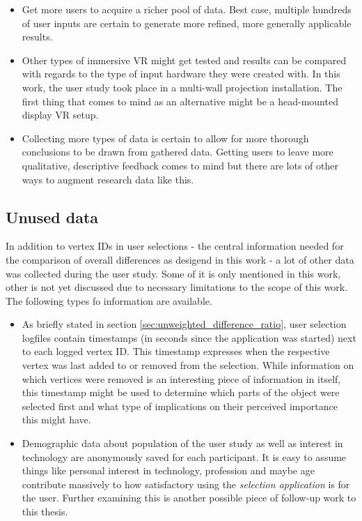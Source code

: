 \begin{itemize}
	\item Get more users to acquire a richer pool of data. Best case, multiple hundreds of user inputs are certain to generate more refined, more generally applicable results.
	\item Other types of immersive VR might get tested and results can be compared with regards to the type of input hardware they were created with. In this work, the user study took place in a multi-wall projection installation. The first thing that comes to mind as an alternative might be a head-mounted display VR setup.
	\item Collecting more types of data is certain to allow for more thorough conclusions to be drawn from gathered data. Getting users to leave more qualitative, descriptive feedback comes to mind but there are lots of other ways to augment research data like this.
\end{itemize}

	\subsection{Unused data}
	\label{sec:unused_data}
In addition to vertex IDs in user selections - the central information needed for the comparison of overall differences as desigend in this work - a lot of other data was collected during the user study. Some of it is only mentioned in this work, other is not yet discussed due to necessary limitations to the scope of this work. The following types fo information are available.

\begin{itemize}
	\item As briefly stated in section \ref{sec:unweighted_difference_ratio}, user selection logfiles contain timestamps (in seconds since the application was started) next to each logged vertex ID. This timestamp expresses when the respective vertex was last added to or removed from the selection. While information on which vertices were removed is an interesting piece of information in itself, this timestamp might be used to determine which parts of the object were selected first and what type of implications on their perceived importance this might have.
	\item Demographic data about population of the user study as well as interest in technology are anonymously saved for each participant. It is easy to assume things like personal interest in technology, profession and maybe age contribute massively to how satisfactory using the \textit{selection application} is for the user. Further examining this is another possible piece of follow-up work to this thesis.
\end{itemize}

